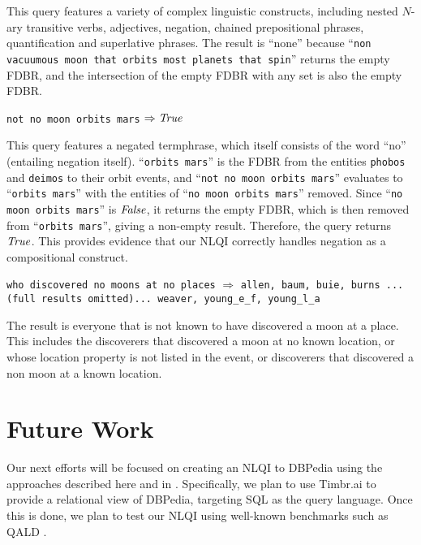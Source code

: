 \documentclass[../main.tex]{subfiles}
\begin{document}
\begin{refsection}
\examplespacing

\noindent This query features a variety of complex linguistic constructs, including nested $N$-ary transitive verbs, adjectives, negation, chained prepositional phrases, quantification and superlative phrases.  The result is ``none'' because ``\texttt{non vacuumous moon that orbits most planets that spin}'' returns the empty FDBR, and the intersection of the empty FDBR with any set is also the empty FDBR.

\examplespacing

\texttt{not no moon orbits mars} $\Rightarrow \mathit{True}$

\examplespacing

\noindent This query features a negated termphrase, which itself consists of the word ``no'' (entailing negation itself). ``\texttt{orbits mars}'' is the FDBR from the entities \texttt{phobos} and \texttt{deimos} to their orbit events, and ``\texttt{not no moon orbits mars}'' evaluates to ``\texttt{orbits mars}'' with the entities of ``\texttt{no moon orbits mars}'' removed.  Since ``\texttt{no moon orbits mars}'' is $\mathit{False}$, it returns the empty FDBR, which is then removed from ``\texttt{orbits mars}'', giving a non-empty result.  Therefore, the query returns $\mathit{True}$. This provides evidence that our NLQI correctly handles negation as a compositional construct.

\examplespacing

\texttt{who discovered no moons at no places} $\Rightarrow$ \texttt{allen, baum, buie, burns ...(full results omitted)... weaver, young\_e\_f, young\_l\_a}

\examplespacing

The result is everyone that is not known to have discovered a moon at a place.  This includes the discoverers that discovered a moon at no known location, or whose location property is not listed in the event, or discoverers that discovered a non moon at a known location.

\examplespacing

\section{Future Work}
\label{sec:future}

\noindent Our next efforts will be focused on creating an NLQI to DBPedia using the approaches
described here and in \cite{peelar2020webistjournal}.  Specifically, we plan to use Timbr.ai \cite{timbr} to provide a relational view of DBPedia, targeting SQL as the query language.
Once this is done, we plan to test our NLQI using well-known benchmarks such as QALD \cite{qald9}.


\end{refsection}
\end{document}
